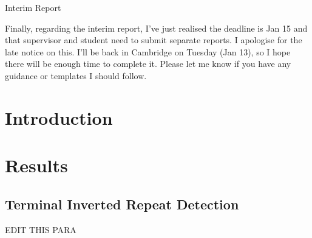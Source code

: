 \documentclass[12pt]{article}
\begin{document}
Interim Report

Finally, regarding the interim report, I've just realised the deadline is Jan 15 and that supervisor and student need to submit separate reports. I apologise for the late notice on this. I'll be back in Cambridge on Tuesday (Jan 13), so I hope there will be enough time to complete it. Please let me know if you have any guidance or templates I should follow.

\fi

\newpage
\section{Introduction}



\newpage
\section{Results}

\subsection{Terminal Inverted Repeat Detection}

EDIT THIS PARA
\end{document}
